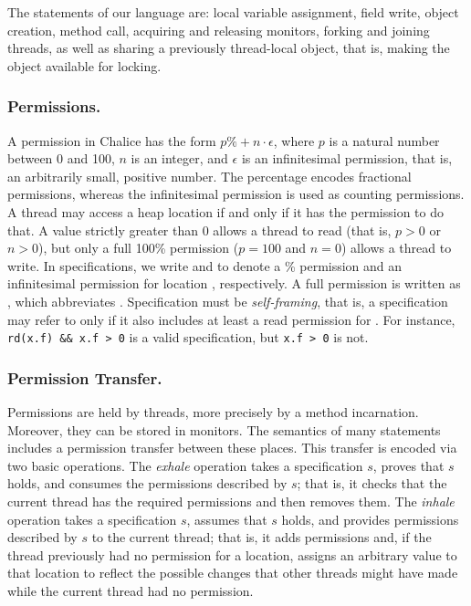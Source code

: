 \documentclass{llncs}
\begin{document}
The statements of our language are: local variable assignment, field
write, object creation, method call, acquiring and releasing monitors,
forking and joining threads, as well as sharing a previously
thread-local object, that is, making the object available for locking.

\goup
\goup
\subsubsection{Permissions.}

\lstset{basicstyle=\sffamily\normalsize}
A permission in Chalice has the form $p\% + n\cdot\epsilon$, where $p$
is a natural number between 0 and 100, $n$ is an integer, and
$\epsilon$ is an infinitesimal permission, that is, an arbitrarily
small, positive number. The percentage encodes fractional permissions,
whereas the infinitesimal permission is used as counting permissions.
A thread may access a heap location if and only if it has the
permission to do that. A value strictly greater than 0 allows a thread
to read (that is, $p > 0$ or $n>0$), but only a full 100\% permission
($p=100$ and $n=0$) allows a thread to write. In specifications, we
write  and  to denote a
\% permission and an infinitesimal permission for
location , respectively. A full permission is written
as , which abbreviates .
Specification must be \emph{self-framing}, that is, a specification may refer to
 only if it also includes at least a read permission
for . For instance, \lstinline{rd(x.f) && x.f > 0} is
a valid specification, but  \lstinline{x.f > 0} is not. 

\goup
\goup
\subsubsection{Permission Transfer.}

\lstset{basicstyle=\sffamily\scriptsize} 
Permissions are held by
threads, more precisely by a method incarnation. Moreover, they can be stored in monitors. The semantics of many statements includes a permission transfer between these
places. This transfer is encoded via two basic operations. The
\emph{exhale} operation takes a specification $s$, proves that $s$
holds, and consumes the permissions described by $s$; that is, it
checks that the current thread has the required permissions and then
removes them. The \emph{inhale} operation takes a specification $s$,
assumes that $s$ holds, and provides permissions described by $s$ to
the current thread; that is, it adds permissions and, if the thread
previously had no permission for a location, assigns an arbitrary
value to that location to reflect the possible changes that other
threads might have made while the current thread had no permission.
\end{document}
